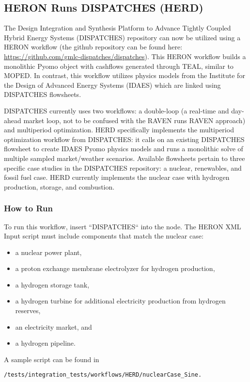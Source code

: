 \subsection{HERON Runs DISPATCHES (HERD)}
The Design Integration and Synthesis Platform to Advance Tightly Coupled Hybrid Energy Systems (DISPATCHES) repository can now be utilized using a HERON workflow (the github repository can be found here: \url{https://github.com/gmlc-dispatches/dispatches}). This HERON workflow builds a monolithic Pyomo object with cashflows generated through TEAL, similar to MOPED. In contrast, this workflow utilizes physics models from the Institute for the Design of Advanced Energy Systems (IDAES) which are linked using DISPATCHES flowsheets. 

DISPATCHES currently uses two workflows: a double-loop (a real-time and day-ahead market loop, not to be confused with the RAVEN runs RAVEN approach) and multiperiod optimization.  HERD specifically implements the multiperiod optimization workflow from DISPATCHES: it calls on an existing DISPATCHES flowsheet to create IDAES Pyomo physics models and runs a monolithic solve of multiple sampled market/weather scenarios. Available flowsheets pertain to three specific case studies in the DISPATCHES repository: a nuclear, renewables, and fossil fuel case. HERD currently implements the nuclear case with hydrogen production, storage, and combustion. 

\subsubsection{How to Run}
To run this workflow, insert “DISPATCHES“ into the  node. The HERON XML Input script must include components that match the nuclear case:
\begin{itemize}
  \item a nuclear power plant,
  \item a proton exchange membrane electrolyzer for hydrogen production,
  \item a hydrogen storage tank,
  \item a hydrogen turbine for additional electricity production from hydrogen reserves,
  \item an electricity market, and
  \item a hydrogen pipeline.
\end{itemize}
A sample script can be found in
\begin{lstlisting}
/tests/integration_tests/workflows/HERD/nuclearCase_Sine.
\end{lstlisting} 

